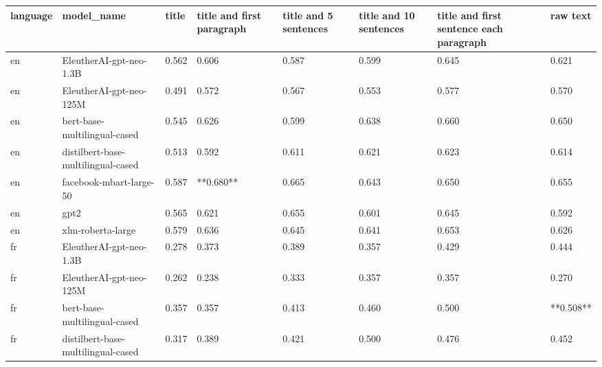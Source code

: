 \begin{tabular}{llllllll}
\toprule
language &                         model\_name & title & title and first paragraph & title and 5 sentences & title and 10 sentences & title and first sentence each paragraph &  raw text \\
\midrule
      en &            EleutherAI-gpt-neo-1.3B & 0.562 &                     0.606 &                 0.587 &                  0.599 &                                   0.645 &     0.621 \\
      en &            EleutherAI-gpt-neo-125M & 0.491 &                     0.572 &                 0.567 &                  0.553 &                                   0.577 &     0.570 \\
      en &       bert-base-multilingual-cased & 0.545 &                     0.626 &                 0.599 &                  0.638 &                                   0.660 &     0.650 \\
      en & distilbert-base-multilingual-cased & 0.513 &                     0.592 &                 0.611 &                  0.621 &                                   0.623 &     0.614 \\
      en &            facebook-mbart-large-50 & 0.587 &                 **0.680** &                 0.665 &                  0.643 &                                   0.650 &     0.655 \\
      en &                               gpt2 & 0.565 &                     0.621 &                 0.655 &                  0.601 &                                   0.645 &     0.592 \\
      en &                  xlm-roberta-large & 0.579 &                     0.636 &                 0.645 &                  0.641 &                                   0.653 &     0.626 \\
      fr &            EleutherAI-gpt-neo-1.3B & 0.278 &                     0.373 &                 0.389 &                  0.357 &                                   0.429 &     0.444 \\
      fr &            EleutherAI-gpt-neo-125M & 0.262 &                     0.238 &                 0.333 &                  0.357 &                                   0.357 &     0.270 \\
      fr &       bert-base-multilingual-cased & 0.357 &                     0.357 &                 0.413 &                  0.460 &                                   0.500 & **0.508** \\
      fr & distilbert-base-multilingual-cased & 0.317 &                     0.389 &                 0.421 &                  0.500 &                                   0.476 &     0.452 \\

\end{tabular}

